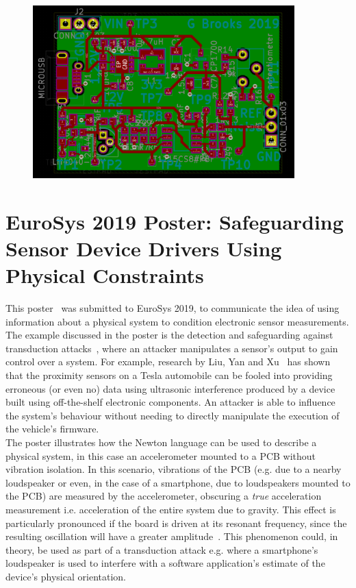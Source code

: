 \documentclass[12pt]{article}
\begin{document}
\begin{appendix}
    \vspace{-1.5cm}
    \begin{figure}[H]
      \centering
      \includegraphics[angle=90, width=0.9\textwidth]{fig/pcb.PNG}
      \label{fig:pcb}
    \end{figure}

    \newpage


  \section{EuroSys 2019 Poster: Safeguarding Sensor Device Drivers Using Physical Constraints} \label{poster_appendix}
    This poster~\cite{eurosys_poster} was submitted to EuroSys 2019, to communicate the idea of using information about a physical system to condition electronic sensor measurements. The example discussed in the poster is the detection and safeguarding against transduction attacks~\cite{Fu_2018}, where an attacker manipulates a sensor's output to gain control over a system. For example, research by Liu, Yan and Xu~\cite{autonomous_vehicles} has shown that the proximity sensors on a Tesla automobile can be fooled into providing erroneous (or even no) data using ultrasonic interference produced by a device built using off-the-shelf electronic components. An attacker is able to influence the system's behaviour without needing to directly manipulate the execution of the vehicle's firmware.\\

    The poster illustrates how the Newton language can be used to describe a physical system, in this case an accelerometer mounted to a PCB without vibration isolation. In this scenario, vibrations of the PCB (e.g. due to a nearby loudspeaker or even, in the case of a smartphone, due to loudspeakers mounted to the PCB) are measured by the accelerometer, obscuring a \textit{true} acceleration measurement i.e. acceleration of the entire system due to gravity. This effect is particularly pronounced if the board is driven at its resonant frequency, since the resulting oscillation will have a greater amplitude~\cite{adi}. This phenomenon could, in theory, be used as part of a transduction attack e.g. where a smartphone's loudspeaker is used to interfere with a software application's estimate of the device's physical orientation.\\


\end{appendix}
\end{document}
